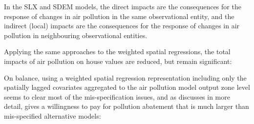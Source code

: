 \documentclass[]{book}
\newenvironment{Shaded}{\begin{snugshade}}{\end{snugshade}}
\newcommand{\CommentTok}[1]{\textcolor[rgb]{0.56,0.35,0.01}{\textit{#1}}}
\newcommand{\DataTypeTok}[1]{\textcolor[rgb]{0.13,0.29,0.53}{#1}}
\newcommand{\DecValTok}[1]{\textcolor[rgb]{0.00,0.00,0.81}{#1}}
\newcommand{\KeywordTok}[1]{\textcolor[rgb]{0.13,0.29,0.53}{\textbf{#1}}}
\newcommand{\NormalTok}[1]{#1}
\newcommand{\OperatorTok}[1]{\textcolor[rgb]{0.81,0.36,0.00}{\textbf{#1}}}
\newcommand{\StringTok}[1]{\textcolor[rgb]{0.31,0.60,0.02}{#1}}
\begin{document}
In the SLX and SDEM models, the direct impacts are the consequences for the response of changes in air pollution in the same observational entity, and the indirect (local) impacts are the consequences for the response of changes in air pollution in neighbouring observational entities.

\begin{Shaded}
\end{Shaded}

Applying the same approaches to the weighted spatial regressions, the total impacts of air pollution on house values are reduced, but remain significant:

\begin{Shaded}
\end{Shaded}

On balance, using a weighted spatial regression representation including only the spatially lagged covariates aggregated to the air pollution model output zone level seems to clear most of the mis-specification issues, and as \citet{bivand17} discusses in more detail, gives a willingness to pay for pollution abatement that is much larger than mis-specified alternative models:
\end{document}
